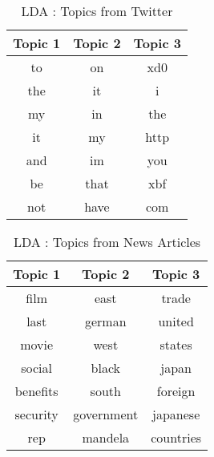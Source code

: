 \begin{table}
	\centering
    \begin{tabular}{|c|c|c|}
    \hline

    \multicolumn{1}{|c|}{\textbf{Topic 1}} & \multicolumn{1}{|c|}{\textbf{Topic 2}} & \multicolumn{1}{|c|}{\textbf{Topic 3}} \\
    \hline
    to  & on   & xd0  \\ 
    the & it   & i    \\ 
     my & in   & the  \\ 
     it & my   & http \\
    and & im   & you  \\ 
     be & that & xbf  \\ 
    not & have & com  \\ 
    \hline
    \end{tabular}
    \caption {LDA : Topics from Twitter }
\end{table}

\begin{table}
	\centering
    \begin{tabular}{|c|c|c|}
    \hline
    \multicolumn{1}{|c|}{\textbf{Topic 1}} & \multicolumn{1}{|c|}{\textbf{Topic 2}} & \multicolumn{1}{|c|}{\textbf{Topic 3}} \\
    \hline
 film	& east	& trade \\ 
 last	& german	& united \\ 
 movie	& west	& states \\ 
 social	& black	& japan \\ 
 benefits	& south	& foreign \\ 
 security	& government	& japanese \\ 
 rep	& mandela	& countries \\ 
 	\hline
     \end{tabular}
     \caption {LDA : Topics from News Articles }
\end{table}